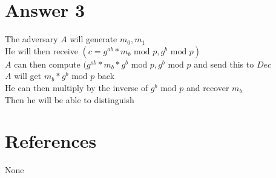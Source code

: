 \documentclass[11pt]{article}
\theoremstyle{definition}
\begin{document}
\section*{Answer 3}
The adversary $A$ will generate $m_0,m_1$\\
He will then receive $(c = g^{ab} * m_b \text{ mod } p, g^b \text{ mod } p)$\\
$A$ can then compute $(g^{ab} * m_b * g^b \text{ mod } p, g^b \text { mod } p$ and send this to $Dec$\\
$A$ will get $m_b * g^b \text{ mod } p$ back\\
He can then multiply by the inverse of $g^b \text{ mod } p$ and recover $m_b$\\
Then he will be able to distinguish
\noindent\hrulefill


\section*{References}

None
\end{document}
